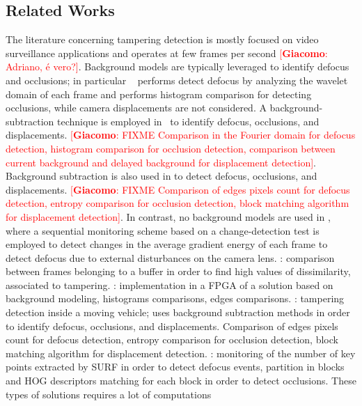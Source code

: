 \documentclass{llncs}
\newcommand{\gi}[1]{{\textcolor{red}{[\small \textbf{Giacomo}: #1]}}}
\begin{document}
 
\subsection{Related Works}\label{subsec:relWorks}
The literature concerning tampering detection is mostly focused on video surveillance applications and operates at few frames per second \gi{Adriano, \'e vero?}. Background models are typically leveraged to identify defocus and occlusions; in particular  ~\cite{aksay2007camera} performs detect defocus by analyzing the wavelet domain of each frame and performs histogram comparison for detecting occlusions, while camera displacements are not considered. A background-subtraction technique is employed in~\cite{saglam2009real} to identify defocus, occlusions, and displacements. \gi{FIXME Comparison in the Fourier domain for defocus detection, histogram comparison for occlusion detection, comparison between current background and delayed background for displacement detection}. Background subtraction is also used in \cite{gil2007automatic} to detect defocus, occlusions, and displacements. \gi{FIXME Comparison of edges pixels count for defocus detection, entropy comparison for occlusion detection, block matching algorithm for displacement detection}.
In contrast, no background models are used in \cite{alippi2010detecting}, where a sequential monitoring scheme based on a change-detection test is employed to detect changes in the average gradient energy of each frame to detect defocus due to external disturbances on the camera lens.  
\cite{ribnick2006real}: comparison between frames belonging to a buffer in order to find high values of dissimilarity, associated to tampering.
\cite{kryjak2012fpga}: implementation in a FPGA of a solution based on background modeling, histograms comparisons, edges comparisons.
\cite{harasse2004automated}: tampering detection inside a moving vehicle; uses background subtraction methods in order to identify defocus, occlusions, and displacements. Comparison of edges pixels count for defocus detection, entropy comparison for occlusion detection, block matching algorithm for displacement detection.
\cite{tsesmelis2013tamper}: monitoring of the number of key points extracted by SURF in order to detect defocus events, partition in blocks and HOG descriptors matching for each block in order to detect occlusions. These types of solutions requires a lot of computations
\end{document}
